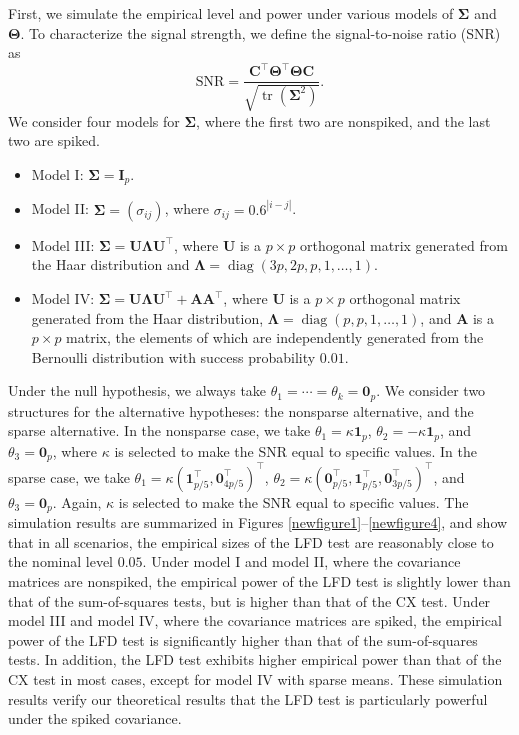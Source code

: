\documentclass[12pt]{article} %
\DeclareMathOperator{\mytr}{tr}
\DeclareMathOperator{\mydiag}{diag}
\newcommand{\bA}{\mathbf{A}}
\newcommand{\bC}{\mathbf{C}}
\newcommand{\bI}{\mathbf{I}}
\newcommand{\bU}{\mathbf{U}}
\newcommand{\bfsym}[1]{\ensuremath{\boldsymbol{#1}}}
\def\bLambda {\bfsym {\Lambda}}
\def\bSigma {\bfsym {\Sigma}}
\def\bTheta {\bfsym {\Theta}}
\theoremstyle{definition}
\begin{document}
First, we simulate the empirical level and power under various models of $\bSigma$ and $\bTheta$.
To characterize the signal strength,
we define the signal-to-noise ratio (SNR) as
$$
\textrm{SNR}=\frac{ \bC^\top \bTheta^\top \bTheta\bC}{\sqrt{\mytr(\bSigma^2)}}.
$$
We consider four models for $\bSigma$, where the first two are nonspiked, and the last two are spiked.
\begin{itemize}
    \item Model I:
        $\bSigma= \bI_p$.
    \item Model II:
        $\bSigma = (\sigma_{ij})$, where $\sigma_{ij}=0.6^{|i-j|}$.
    \item Model III:
        $\bSigma= \bU \bLambda \bU^\top$, where $\bU$ is a $p\times p$ orthogonal matrix generated from the Haar distribution and $\bLambda=\mydiag(3p,2p,p,1,\ldots,1)$.
    \item Model IV:
        $\bSigma=  \bU \bLambda \bU^\top+\bA \bA^\top$, where $\bU$ is a $p\times p$ orthogonal matrix generated from the Haar distribution, $\bLambda=\mydiag(p,p,1,\ldots,1)$, and $\bA$ is a $p\times p$ matrix, the elements of which are independently generated from the Bernoulli distribution with success probability $0.01$.
\end{itemize}
Under the null hypothesis, we always take $\theta_1=\cdots=\theta_k=\mathbf{0}_p$.
We consider two structures for the alternative hypotheses: the nonsparse alternative, and the sparse alternative.
In the nonsparse case, we take $\theta_1=\kappa \mathbf 1_p$, $\theta_2=-\kappa \mathbf 1_p$, and $\theta_3=\mathbf{0}_p$, where $\kappa$ is selected to make the SNR equal to specific values.
In the sparse case, we take $\theta_1=\kappa (\mathbf 1_{p/5}^\top,\mathbf{0}_{4p/5}^\top)^\top$, $\theta_2=\kappa (\mathbf{0}_{p/5}^\top, \mathbf 1_{p/5}^\top,\mathbf{0}_{3p/5}^\top)^\top$, and $\theta_3=\mathbf{0}_p$.
Again, $\kappa$ is selected to make the SNR equal to specific values.
The simulation results are summarized in Figures \ref{newfigure1}--\ref{newfigure4}, and show that in all scenarios, the empirical sizes of the LFD test are reasonably close to the nominal level $0.05$.
Under model I and model II, where the covariance matrices are nonspiked, the empirical power of the LFD test is slightly lower than that of the sum-of-squares tests, but is higher than that of the CX test.
Under model III and model IV, where the covariance matrices are spiked, the empirical power of the LFD test is significantly higher than that of the sum-of-squares tests.
In addition, the LFD test exhibits higher empirical power than that of the CX test in most cases, except for model IV with sparse means.
These simulation results verify our theoretical results that the LFD test is particularly powerful under the spiked covariance.
\end{document}

